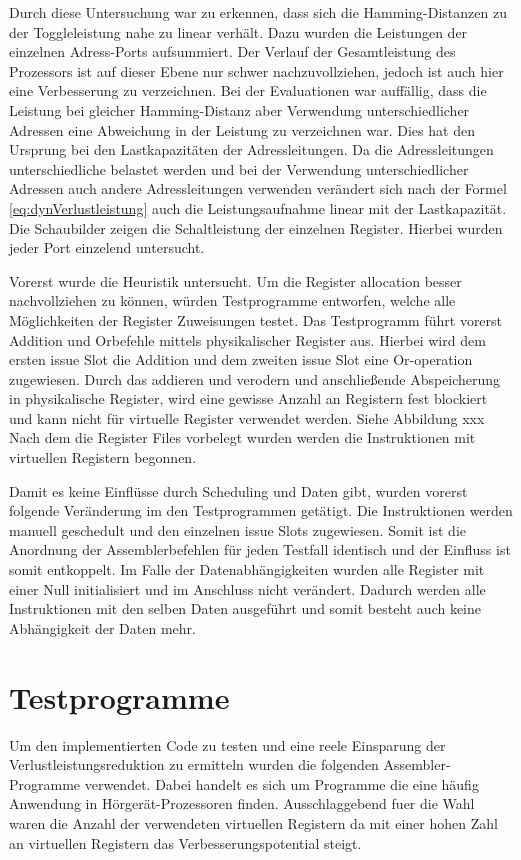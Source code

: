 Durch diese Untersuchung war zu erkennen, dass sich die Hamming-Distanzen zu der Toggleleistung nahe zu linear verhält. Dazu wurden die Leistungen der einzelnen Adress-Ports aufsummiert. Der Verlauf der Gesamtleistung des Prozessors ist auf dieser Ebene nur schwer nachzuvollziehen, jedoch ist auch hier eine Verbesserung zu verzeichnen. 
Bei der Evaluationen war auffällig, dass die Leistung bei gleicher Hamming-Distanz aber Verwendung unterschiedlicher Adressen eine Abweichung in der Leistung zu verzeichnen war. Dies hat den Ursprung bei den Lastkapazitäten der Adressleitungen. Da die Adressleitungen unterschiedliche belastet werden und bei der Verwendung unterschiedlicher Adressen auch andere Adressleitungen verwenden verändert sich nach der Formel \ref{eq:dynVerlustleistung} auch die Leistungsaufnahme linear mit der Lastkapazität. 
Die Schaubilder zeigen die Schaltleistung der einzelnen Register. Hierbei wurden jeder Port einzelend untersucht. 

Vorerst wurde die Heuristik untersucht.
Um die Register allocation besser nachvollziehen zu können, würden Testprogramme entworfen, welche alle Möglichkeiten der Register Zuweisungen testet. Das Testprogramm führt vorerst Addition und Orbefehle mittels physikalischer Register aus. Hierbei wird dem ersten issue Slot die Addition und dem zweiten issue Slot eine Or-operation zugewiesen. Durch das addieren und verodern und anschließende Abspeicherung in physikalische Register, wird eine gewisse Anzahl an Registern fest blockiert und kann nicht für virtuelle Register verwendet werden. Siehe Abbildung xxx
Nach dem die Register Files vorbelegt wurden werden die Instruktionen mit virtuellen Registern begonnen.

Damit es keine Einflüsse durch Scheduling und Daten gibt, wurden vorerst folgende Veränderung im den Testprogrammen getätigt. Die Instruktionen werden manuell geschedult und den einzelnen issue Slots zugewiesen. Somit ist die Anordnung der Assemblerbefehlen für jeden Testfall identisch und der Einfluss ist somit entkoppelt. Im Falle der Datenabhängigkeiten wurden alle Register mit einer Null initialisiert und im Anschluss nicht verändert. Dadurch werden alle Instruktionen mit den selben Daten ausgeführt und somit besteht auch keine Abhängigkeit der Daten mehr. 



\section{Testprogramme}
\label{sec:testprogamme}
Um den implementierten Code zu testen und eine reele Einsparung der Verlustleistungsreduktion zu ermitteln wurden die folgenden Assembler-Programme verwendet. Dabei handelt es sich um Programme die eine häufig Anwendung in Hörgerät-Prozessoren finden. Ausschlaggebend fuer die Wahl waren die Anzahl der verwendeten virtuellen Registern da mit einer hohen Zahl an virtuellen Registern das Verbesserungspotential steigt.
